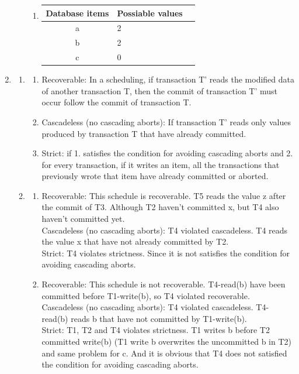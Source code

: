 \documentclass[12pt]{extarticle}
\begin{document}
\begin{flushleft}
\begin{enumerate}
\begin{enumerate}
\begin{enumerate}
\item
\begin{tabular}{cll}
\toprule
\textbf{Database items} & \textbf{Possiable values} \\
\midrule
a     & 2   \\
b     & 2    \\
c     & 0    \\
\bottomrule
\end{tabular}
\end{enumerate}

\end{enumerate}

\item

\begin{enumerate}
\item

\begin{enumerate}
\item Recoverable: In a scheduling, if transaction T' reads the modified data of another transaction T, then the commit of transaction T' must occur follow the commit of transaction T.
\item Cascadeless (no cascading aborts): If transaction T' reads only values produced by transaction T that have already committed.
\item Strict: if 1. satisfies the condition for avoiding cascading aborts and 2. for every transaction, if it writes an item, all the transactions that previously wrote that item have already committed or aborted.
\end{enumerate}

\item

\begin{enumerate}
\item
Recoverable: This schedule is recoverable. T5 reads the value z after the commit of T3. Although T2 haven't committed x, but T4 also haven't committed yet.\\
Cascadeless (no cascading aborts): T4 violated cascadeless. T4 reads the value x that have not already committed by T2. \\
Strict: T4 violates strictness. Since it is not satisfies the condition for avoiding cascading aborts.\\

\item
Recoverable: This schedule is not recoverable. T4-read(b) have been committed before T1-write(b), so T4 violated recoverable.\\
Cascadeless (no cascading aborts): T4 violated cascadeless. T4-read(b) reads b that have not committed by T1-write(b).\\
Strict: T1, T2 and T4 violates strictness. T1 writes b before T2 committed write(b) (T1 write b overwrites the uncommitted b in T2) and same problem for c. And it is obvious that  T4 does not satisfied the condition for avoiding cascading aborts.\\
\end{enumerate}


\end{enumerate}
\end{enumerate}
\end{flushleft}
\end{document}
